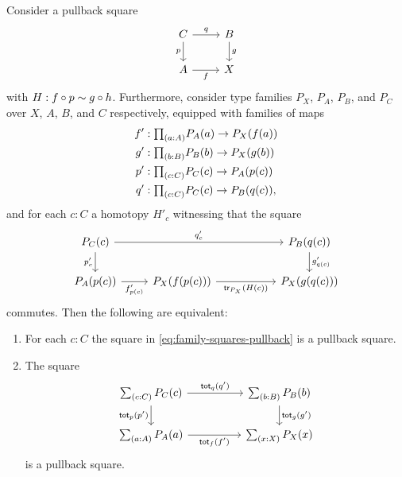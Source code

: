 \begin{lem}
Consider a pullback square
  \begin{equation*}
    \begin{tikzcd}
      C \arrow[r,"q"] \arrow[d,swap,"p"] & B \arrow[d,"g"] \\
      A \arrow[r,swap,"f"] & X
    \end{tikzcd}
  \end{equation*}
  with $H : f \circ p \sim g \circ h$. Furthermore, consider type families $P_X$, $P_A$, $P_B$, and $P_C$ over $X$, $A$, $B$, and $C$ respectively, equipped with families of maps
  \begin{align*}
    f' & : \prd{a:A} P_A(a) \to P_X(f(a)) \\
    g' & : \prd{b:B} P_B(b) \to P_X(g(b)) \\
    p' & : \prd{c:C} P_C(c) \to P_A(p(c)) \\
    q' & : \prd{c:C} P_C(c) \to P_B(q(c)),
  \end{align*}
  and for each $c:C$ a homotopy $H'_c$ witnessing that the square
  \begin{equation}\label{eq:family-squares-pullback}
    \begin{tikzcd}
      P_C(c) \arrow[rr,"{q'_c}"] \arrow[d,swap,"{p'_c}"] & &[3em] P_B(q(c)) \arrow[d,"{g'_{q(c)}}"] \\
      P_A(p(c)) \arrow[r,swap,"{f'_{p(c)}}"] & P_X(f(p(c))) \arrow[r,swap,"{\tr_{P_X}(H(c))}"] & P_X(g(q(c)))
    \end{tikzcd}
  \end{equation}
  commutes. Then the following are equivalent:
  \begin{enumerate}
  \item For each $c:C$ the square in \cref{eq:family-squares-pullback} is a pullback square.
  \item The square
    \begin{equation}\label{eq:total-square-pullback}
      \begin{tikzcd}[column sep=huge]
        \sm{c:C}P_C(c)
        \arrow[r,"{\total[q]{q'}}"] \arrow[d,swap,"{\total[p]{p'}}"] &
        \sm{b:B}P_B(b) \arrow[d,"{\total[g]{g'}}"] \\
        \sm{a:A}P_A(a) \arrow[r,swap,"{\total[f]{f'}}"] & \sm{x:X}P_X(x)
      \end{tikzcd}
    \end{equation}
    is a pullback square.
  \end{enumerate}
\end{lem}


